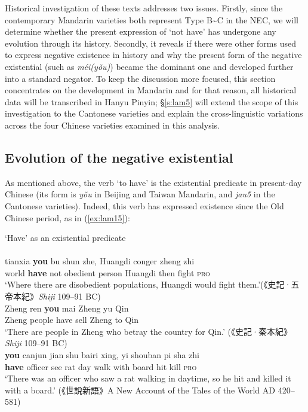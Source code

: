 \documentclass[output=paper]{langscibook}
\begin{document}

Historical investigation of these texts addresses two issues. Firstly, since the contemporary Mandarin varieties both represent Type B\sim C in the NEC, we will determine whether the present expression of `not have' has undergone any evolution through its history. Secondly, it reveals if there were other forms used to express negative existence in history and why the present form of the negative existential (such as \textit{méi(yǒu)}) became the dominant one and developed further into a standard negator. To keep the discussion more focused, this section concentrates on the development in Mandarin and for that reason, all historical data will be transcribed in Hanyu Pinyin; §\ref{s:lam5} will extend the scope of this investigation to the Cantonese varieties and explain the cross-linguistic variations across the four Chinese varieties examined in this analysis. 


\subsection{Evolution of the negative existential}\label{s:lam4-1}

As mentioned above, the verb `to have' is the existential predicate in present-day Chinese (its form is \textit{yǒu} in Beijing and Taiwan Mandarin, and \textit{jau5} in the Cantonese varieties). Indeed, this verb has expressed existence since the Old Chinese period, as in (\ref{ex:lam15}):

\ea `Have' as an existential predicate  \label{ex:lam15}\\
   \label{ex:lam15a}\\
  	\gll tianxia \textbf{you} bu shun zhe, Huangdi conger zheng zhi\\
  	world \textbf{have} not obedient person Huangdi then fight \textsc{pro}\\
  	\glt `Where there are disobedient populations, Huangdi would fight them.'({\cn 《史記·五帝本紀》}\emph{Shiji} 109–91 BC)
   \label{ex:lam15b}\\
  	\gll Zheng ren \textbf{you}	mai	Zheng yu Qin\\
  	Zheng people have sell Zheng to Qin\\
  	\glt `There are people in Zheng who betray the country for Qin.' ({\cn 《史記·秦本紀》}\emph{Shiji} 109–91 BC)
   \label{ex:lam15c}\\
	\gll \textbf{you} canjun jian shu bairi xing, yi shouban pi sha zhi\\
	\textbf{have} officer see rat day walk with board hit kill \textsc{pro}\\
	\glt`There was an officer who saw a rat walking in daytime, so he hit and killed it with a board.' ({\cn 《世說新語》}A New Account of the Tales of the World AD 420–581)
\z \z 
\end{document}
